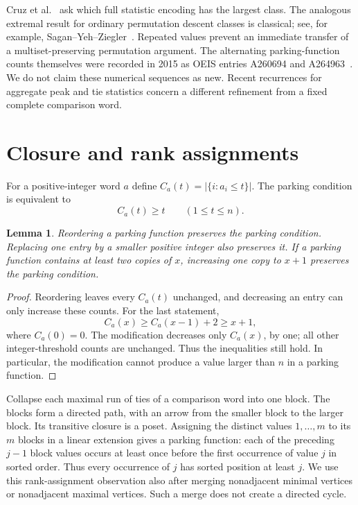 \documentclass[11pt]{article}
\newtheorem{lemma}[theorem]{Lemma}
\theoremstyle{definition}
\begin{document}
Cruz et al.~\cite{Cruz2024} ask which full statistic encoding has
the largest class. The analogous extremal result for ordinary
permutation descent classes is classical; see, for example,
Sagan--Yeh--Ziegler~\cite{Sagan1994}. Repeated values prevent
an immediate transfer of a multiset-preserving permutation argument.
The alternating parking-function counts themselves were recorded in
2015 as OEIS entries A260694 and A264963~\cite{OEISup,OEISdown}.
We do not claim these numerical sequences as new.
Recent recurrences for aggregate peak and tie statistics
\cite{Alexandersson2026} concern a different refinement from a fixed
complete comparison word.

\section{Closure and rank assignments}\label{sec:closure}
For a positive-integer word $a$ define
$C_a(t)=|\{i:a_i\le t\}|$.
The parking condition is equivalent to
\[
C_a(t)\ge t\qquad(1\le t\le n).
\]

\begin{lemma}\label{lem:closure}
Reordering a parking function preserves the parking condition.
Replacing one entry by a smaller positive integer also preserves it.
If a parking function contains at least two copies of $x$, increasing
one copy to $x+1$ preserves the parking condition.
\end{lemma}
\begin{proof}
Reordering leaves every $C_a(t)$ unchanged, and decreasing an entry
can only increase these counts. For the last statement,
\[
C_a(x)\ge C_a(x-1)+2\ge x+1,
\]
where $C_a(0)=0$. The modification decreases only $C_a(x)$, by one;
all other integer-threshold counts are unchanged. Thus the inequalities
still hold. In particular, the modification cannot produce a value
larger than $n$ in a parking function.
\end{proof}

Collapse each maximal run of ties of a comparison word into one block.
The blocks form a directed path, with an arrow from the smaller block
to the larger block. Its transitive closure is a poset. Assigning
the distinct values $1,\ldots,m$ to its $m$ blocks in a linear extension
gives a parking function: each of the preceding $j-1$ block values
occurs at least once before the first occurrence of value $j$ in sorted
order. Thus every occurrence of $j$ has sorted position at least $j$.
We use this rank-assignment observation also after merging
nonadjacent minimal vertices or nonadjacent maximal vertices.
Such a merge does not create a directed cycle.
\end{document}
